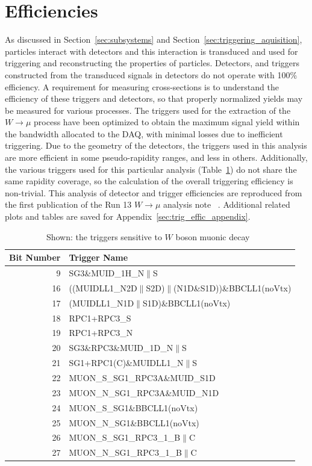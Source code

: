 \clearpage
\section{Efficiencies}
\label{sec:efficiencies}

As discussed in Section~\ref{sec:subsystems} and
Section~\ref{sec:triggering_aquisition}, particles interact with detectors and
this interaction is transduced and used for triggering and reconstructing the
properties of particles. Detectors, and triggers constructed from the transduced
signals in detectors do not operate with 100\% efficiency.  A requirement for
measuring cross-sections is to understand the efficiency of these triggers and
detectors, so that properly normalized yields may be measured for various
processes. The triggers used for the extraction of the $W\rightarrow\mu$ process
have been optimized to obtain the maximum signal yield within the bandwidth
allocated to the DAQ, with minimal losses due to inefficient triggering. Due to
the geometry of the detectors, the triggers used in this analysis are more
efficient in some pseudo-rapidity ranges, and less in others. Additionally, the
various triggers used for this particular analysis (Table~\ref{tab:w_triggers})
do not share the same rapidity coverage, so the calculation of the overall
triggering efficiency is non-trivial. This analysis of detector and trigger
efficiencies are reproduced from the first publication of the Run 13
$W\rightarrow\mu$ analysis note ~\cite{Seidl2014}.  Additional related plots and
tables are saved for Appendix~\ref{sec:trig_effic_appendix}.

\begin{table}[ht]
  \centering
  \begin{tabular}{r l}
    \toprule
    \textbf{Bit Number} & \textbf{Trigger Name} \\ 
    \midrule
    9 & SG3\&MUID\_1H\_N$\|$S\\
    16 & ((MUIDLL1\_N2D$\|$S2D)$\|$(N1D\&S1D))\&BBCLL1(noVtx)\\
    17 & (MUIDLL1\_N1D$\|$S1D)\&BBCLL1(noVtx)\\
    18 & RPC1+RPC3\_S\\
    19 & RPC1+RPC3\_N\\
    20 & SG3\&RPC3\&MUID\_1D\_N$\|$S\\
    21 & SG1+RPC1(C)\&MUIDLL1\_N$\|$S\\
    22 & MUON\_S\_SG1\_RPC3A\&MUID\_S1D\\
    23 & MUON\_N\_SG1\_RPC3A\&MUID\_N1D\\
    24 & MUON\_S\_SG1\&BBCLL1(noVtx)\\
    25 & MUON\_N\_SG1\&BBCLL1(noVtx)\\
    26 & MUON\_S\_SG1\_RPC3\_1\_B$\|$C\\
    27 & MUON\_N\_SG1\_RPC3\_1\_B$\|$C\\ 
    \bottomrule
  \end{tabular}
  \caption{Shown: the triggers sensitive to $W$ boson muonic
  decay~\cite{Seidl2014} }
  \label{tab:w_triggers}
\end{table}
\clearpage

